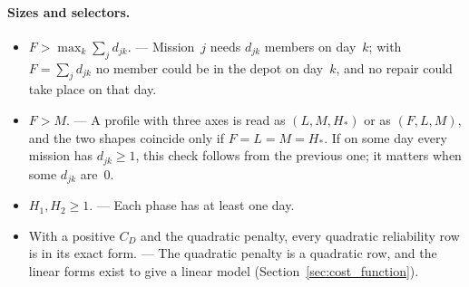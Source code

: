 \documentclass[11pt,a4paper]{article}
\theoremstyle{plain}
\theoremstyle{definition}
\theoremstyle{remark}
\begin{document}
\paragraph{Sizes and selectors.}
\begin{itemize}
  \item $F > \max_k \sum_{j} d_{jk}$. --- Mission~$j$ needs $d_{jk}$ members on day~$k$; with $F = \sum_{j} d_{jk}$ no member could be in the depot on day~$k$, and no repair could take place on that day.
  \item $F > M$. --- A profile with three axes is read as $(L, M, H_*)$ or as $(F, L, M)$, and the two shapes coincide only if $F = L = M = H_*$. If on some day every mission has $d_{jk} \ge 1$, this check follows from the previous one; it matters when some $d_{jk}$ are~$0$.
  \item $H_1, H_2 \ge 1$. --- Each phase has at least one day.
  \item With a positive $C_D$ and the quadratic penalty, every quadratic reliability row is in its exact form. --- The quadratic penalty is a quadratic row, and the linear forms exist to give a linear model (Section~\ref{sec:cost_function}).
\end{itemize}
\end{document}
